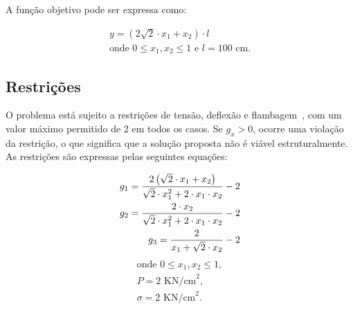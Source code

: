 A função objetivo pode ser expressa como:

\begin{equation}
    \begin{split}
        y = \left( 2 \sqrt{2} \cdot x_1 + x_2 \right) \cdot l \\
        \text{onde~}
        0 \leq x_1, x_2 \leq 1 \text{~e~}
        l = 100 \text{~cm}.
    \end{split}
\end{equation}

\subsection{Restrições}

O problema está sujeito a restrições de tensão, deflexão e flambagem~\cite{fauzi_truss}, com um valor máximo permitido de 2 em todos os casos.
Se \(g_x > 0\), ocorre uma violação da restrição, o que significa que a solução proposta não é viável estruturalmente.
As restrições são expressas pelas seguintes equações:

\begin{gather}
    \begin{subequations}
        \begin{align}
            \begin{split}
                g_1 = \frac{2 \left( \sqrt{2} \cdot x_1 + x_2 \right)}{\sqrt{2} \cdot x_1^2 + 2 \cdot x_1 \cdot x_2} - 2
            \end{split}
            \\
            \begin{split}
                g_2 = \frac{2 \cdot x_2}{\sqrt{2} \cdot x_1^2 + 2 \cdot x_1 \cdot x_2} - 2
            \end{split}
            \\
            \begin{split}
                g_3 = \frac{2}{x_1 + \sqrt{2} \cdot x_2} - 2
            \end{split}
        \end{align}
    \end{subequations}
\end{gather}
\begin{equation*}
    \begin{aligned}
        \text{onde~}
        0 \leq x_1, x_2 \leq 1, \\
        P = 2 \text{~KN/cm}^2,  \\
        \sigma = 2 \text{~KN/cm}^2.
    \end{aligned}
\end{equation*}

